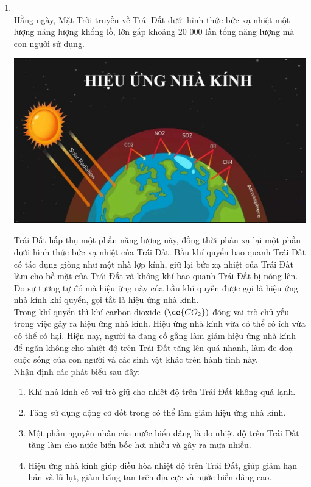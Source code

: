 \begin{enumerate}[label=\bfseries Câu \arabic*:, leftmargin=1.7cm]
\item {}\\
Hằng ngày, Mặt Trời truyền về Trái Đất dưới hình thức bức xạ nhiệt một lượng năng lượng khổng lồ, lớn gấp khoảng 20 000 lần tổng năng lượng mà con người sử dụng. 
\begin{center}
	\includegraphics[width=0.45\linewidth]{../figs/VN12-Y24-PH-SYL-003P-6}
\end{center}
Trái Đất hấp thụ một phần năng lượng này, đồng thời phản xạ lại một phần dưới hình thức bức xạ nhiệt của Trái Đất. Bầu khí quyển bao quanh Trái Đất có tác dụng giống như một nhà lợp kính, giữ lại bức xạ nhiệt của Trái Đất làm cho bề mặt của Trái Đất và không khí bao quanh Trái Đất bị nóng lên. Do sự tương tự đó mà hiệu ứng này của bầu khí quyền được gọi là hiệu ứng nhà kính khí quyển, gọi tắt là hiệu ứng nhà kính.\\
Trong khí quyển thì khí carbon dioxide $\left(\ce{CO_2}\right)$ đóng vai trò chủ yếu trong việc gây ra hiệu ứng nhà kính. Hiệu ứng nhà kính vừa có thể có ích vừa có thể có hại. Hiện nay, người ta đang cố gắng làm giảm hiệu ứng nhà kính để ngăn không cho nhiệt độ trên Trái Đất tăng lên quá nhanh, làm đe doạ cuộc sống của con người và các sinh vật khác trên hành tinh này.\\
Nhận định các phát biểu sau đây: 
\begin{enumerate}[label=\alph*)]
	\item Khí nhà kính có vai trò giữ cho nhiệt độ trên Trái Đất không quá lạnh.
	\item Tăng sử dụng động cơ đốt trong có thể làm giảm hiệu ứng nhà kính.
	\item Một phần nguyên nhân của nước biển dâng là do nhiệt độ trên Trái Đất tăng làm cho nước biển bốc hơi nhiều và gây ra mưa nhiều.
	\item Hiệu ứng nhà kính giúp điều hòa nhiệt độ trên Trái Đất, giúp giảm hạn hán và lũ lụt, giảm băng tan trên địa cực và nước biển dâng cao.
\end{enumerate}
\end{enumerate}
